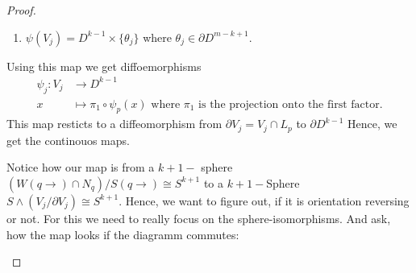 \begin{proof}
\begin{enumerate}
	\item $\psi(V_j)=D^{k-1}\times \{\theta_j\}$ where $\theta_j\in \partial D^{m-k+1}$.
\end{enumerate}
Using this map we get diffoemorphisms 
\begin{align*}
	\psi_j:   V_j &\to D^{k-1}\\
	x             &\mapsto \pi_1\circ \psi_p(x) \text{ where $\pi_1$ is the projection onto the first factor.}
\end{align*} This map resticts to a diffeomorphism from $\partial V_j=V_j\cap L_p$ to $\partial D^{k-1}$  Hence, we get the continouos maps.
\begin{center}
\end{center}
Notice how our map is from a $k+1-$ sphere $(W(q\to)\cap N_q)\big/ S(q\to )\cong S^{k+1}$ to a $k+1-$Sphere $S\wedge (V_j\big/ \partial V_j)\cong S^{k+1}$. Hence, we want to figure out, if it is orientation reversing or not. For this we need to really focus on the sphere-isomorphisms. And ask, how the map looks if the diagramm commutes:
\begin{center}

\end{center}
\end{proof}
